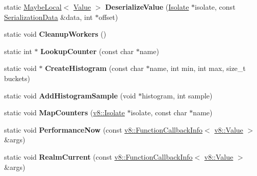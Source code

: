 \begin{DoxyCompactItemize}
\item 
static \hyperlink{classv8_1_1_maybe_local}{Maybe\+Local}$<$ \hyperlink{classv8_1_1_value}{Value} $>$ {\bfseries Deserialize\+Value} (\hyperlink{classv8_1_1_isolate}{Isolate} $\ast$isolate, const \hyperlink{classv8_1_1_serialization_data}{Serialization\+Data} \&data, int $\ast$offset)\hypertarget{classv8_1_1_shell_a00b450d4c47f2a9eeb5151d10337aebc}{}\label{classv8_1_1_shell_a00b450d4c47f2a9eeb5151d10337aebc}

\item 
static void {\bfseries Cleanup\+Workers} ()\hypertarget{classv8_1_1_shell_a1a5dca359368270ebf13267e7161028b}{}\label{classv8_1_1_shell_a1a5dca359368270ebf13267e7161028b}

\item 
static int $\ast$ {\bfseries Lookup\+Counter} (const char $\ast$name)\hypertarget{classv8_1_1_shell_ab3c2e43e32a1543b0a78f728bb3df63a}{}\label{classv8_1_1_shell_ab3c2e43e32a1543b0a78f728bb3df63a}

\item 
static void $\ast$ {\bfseries Create\+Histogram} (const char $\ast$name, int min, int max, size\+\_\+t buckets)\hypertarget{classv8_1_1_shell_a59e39d63603b1766c86614c7a9db0545}{}\label{classv8_1_1_shell_a59e39d63603b1766c86614c7a9db0545}

\item 
static void {\bfseries Add\+Histogram\+Sample} (void $\ast$histogram, int sample)\hypertarget{classv8_1_1_shell_a0a1b3ff04a7253ba159519945ee7e2e8}{}\label{classv8_1_1_shell_a0a1b3ff04a7253ba159519945ee7e2e8}

\item 
static void {\bfseries Map\+Counters} (\hyperlink{classv8_1_1_isolate}{v8\+::\+Isolate} $\ast$isolate, const char $\ast$name)\hypertarget{classv8_1_1_shell_af8dc3050b831dab01d9532612f517a9c}{}\label{classv8_1_1_shell_af8dc3050b831dab01d9532612f517a9c}

\item 
static void {\bfseries Performance\+Now} (const \hyperlink{classv8_1_1_function_callback_info}{v8\+::\+Function\+Callback\+Info}$<$ \hyperlink{classv8_1_1_value}{v8\+::\+Value} $>$ \&args)\hypertarget{classv8_1_1_shell_a20b4f5fb7215088193a8bcf94a622f83}{}\label{classv8_1_1_shell_a20b4f5fb7215088193a8bcf94a622f83}

\item 
static void {\bfseries Realm\+Current} (const \hyperlink{classv8_1_1_function_callback_info}{v8\+::\+Function\+Callback\+Info}$<$ \hyperlink{classv8_1_1_value}{v8\+::\+Value} $>$ \&args)\hypertarget{classv8_1_1_shell_a9a9b12463634c52f521809404acfe972}{}\label{classv8_1_1_shell_a9a9b12463634c52f521809404acfe972}


\end{DoxyCompactItemize}
